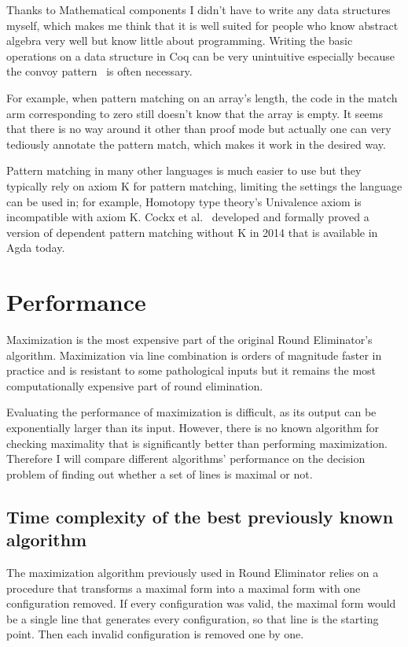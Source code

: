 \documentclass[english, 12pt, a4paper, sci, a-1b, online]{aaltothesis}
\begin{document}
Thanks to Mathematical components I didn't have to write any data structures myself, which makes me think that it is well suited for people who know abstract algebra very well but know little about programming. Writing the basic operations on a data structure in Coq can be very unintuitive especially because the convoy pattern~\cite{CPDT} is often necessary.

For example, when pattern matching on an array's length, the code in the match arm corresponding to zero still doesn't know that the array is empty. It seems that there is no way around it other than proof mode but actually one can very tediously annotate the pattern match, which makes it work in the desired way.

Pattern matching in many other languages is much easier to use but they typically rely on axiom K for pattern matching, limiting the settings the language can be used in; for example, Homotopy type theory's Univalence axiom is incompatible with axiom K. Cockx et al.~\cite{withoutK} developed and formally proved a version of dependent pattern matching without K in 2014 that is available in Agda today.

\section{Performance}\label{performance}

Maximization is the most expensive part of the original Round Eliminator's algorithm. Maximization via line combination is orders of magnitude faster in practice and is resistant to some pathological inputs but it remains the most computationally expensive part of round elimination. %

Evaluating the performance of maximization is difficult, as its output can be exponentially larger than its input. However, there is no known algorithm for checking maximality that is significantly better than performing maximization. Therefore I will compare different algorithms' performance on the decision problem of finding out whether a set of lines is maximal or not.

\subsection{Time complexity of the best previously known algorithm}

The maximization algorithm previously used in Round Eliminator relies on a procedure that transforms a maximal form into a maximal form with one configuration removed. If every configuration was valid, the maximal form would be a single line that generates every configuration, so that line is the starting point. Then each invalid configuration is removed one by one.
\end{document}
